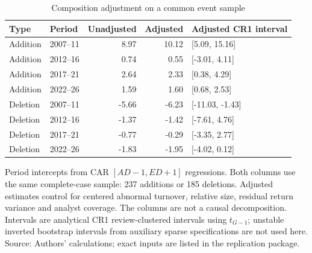 \begin{table}[!htbp]
\centering
\caption{Composition adjustment on a common event sample}\label{tab:composition}
\small
\setlength{\tabcolsep}{5pt}
\begin{tabular}{llrrl}
\toprule
Type & Period & Unadjusted & Adjusted & Adjusted CR1 interval \\
\midrule
Addition & 2007--11 & 8.97 & 10.12 & [5.09, 15.16] \\
Addition & 2012--16 & 0.74 & 0.55 & [-3.01, 4.11] \\
Addition & 2017--21 & 2.64 & 2.33 & [0.38, 4.29] \\
Addition & 2022--26 & 1.59 & 1.60 & [0.68, 2.53] \\
Deletion & 2007--11 & -5.66 & -6.23 & [-11.03, -1.43] \\
Deletion & 2012--16 & -1.37 & -1.42 & [-7.61, 4.76] \\
Deletion & 2017--21 & -0.77 & -0.29 & [-3.35, 2.77] \\
Deletion & 2022--26 & -1.83 & -1.95 & [-4.02, 0.12] \\
\bottomrule
\end{tabular}
\begin{minipage}{\linewidth}\footnotesize\vspace{5pt}
Period intercepts from CAR $[AD-1,ED+1]$ regressions. Both columns use the same complete-case sample: 237 additions or 185 deletions. Adjusted estimates control for centered abnormal turnover, relative size, residual return variance and analyst coverage. The columns are not a causal decomposition. Intervals are analytical CR1 review-clustered intervals using $t_{G-1}$; unstable inverted bootstrap intervals from auxiliary sparse specifications are not used here. Source: Authors' calculations; exact inputs are listed in the replication package.
\end{minipage}
\end{table}
